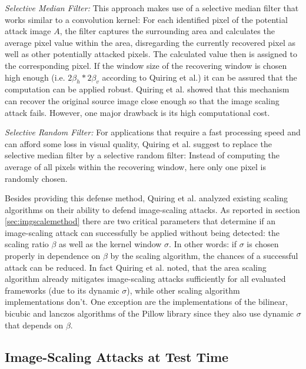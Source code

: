 \documentclass[sigconf]{acmart}
\begin{document}
\textit{Selective Median Filter:}
\label{sec:median_filter}
This approach makes use of a selective median filter that works similar to a convolution kernel: 
For each identified pixel of the potential attack image $A$, the filter captures the surrounding area and calculates the average pixel value within the area, disregarding the currently recovered pixel as well as other potentially attacked pixels.
The calculated value then is assigned to the corresponding pixel.
If the window size of the recovering window is chosen high enough (i.e. $2{\beta}_h * 2{\beta}_v$ according to Quiring et al.) it can be assured that the computation can be applied robust.
Quiring et al. showed that this mechanism can recover the original source image close enough so that the image scaling attack fails.
However, one major drawback is its high computational cost.

\smallbreak

\textit{Selective Random Filter:}
\label{sec:random_filter}
For applications that require a fast processing speed and can afford some loss in visual quality, Quiring et al. suggest to replace the selective median filter by a selective random filter: 
Instead of computing the average of all pixels within the recovering window, here only one pixel is randomly chosen.

\smallbreak

Besides providing this defense method, Quiring et al. analyzed existing scaling algorithms on their ability to defend image-scaling attacks.
As reported in section \ref{sec:imgscalemethod} there are two critical parameters that determine if an image-scaling attack can successfully be applied without being detected: the scaling ratio $\beta$ as well as the kernel window $\sigma$.
In other words: if $\sigma$ is chosen properly in dependence on $\beta$ by the scaling algorithm, the chances of a successful attack can be reduced.
In fact Quiring et al. noted, that the area scaling algorithm already mitigates image-scaling attacks sufficiently for all evaluated frameworks (due to its dynamic $\sigma$), while other scaling algorithm implementations don't.
One exception are the implementations of the bilinear, bicubic and lanczos algorithms of the Pillow library since they also use dynamic $\sigma$ that depends on $\beta$. 

\subsection{Image-Scaling Attacks at Test Time}
\label{sec:testtimeatt}
\end{document}
